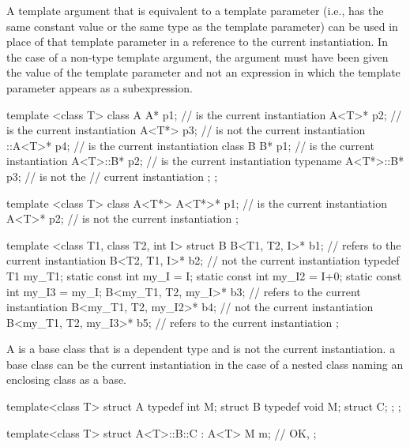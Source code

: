 \pnum
A template argument that is equivalent to a template
parameter (i.e., has the same constant value or the same type
as the template parameter) can be used in place of that
template parameter in a reference to the current
instantiation. In the case of a non-type template argument,
the argument must have been given the value of the
template parameter and not an expression in which the
template parameter appears as a subexpression.
\enterexample
\begin{codeblock}
template <class T> class A {
  A* p1;                        //  is the current instantiation
  A<T>* p2;                     //  is the current instantiation
  A<T*> p3;                     //  is not the current instantiation
  ::A<T>* p4;                   //  is the current instantiation
  class B {
    B* p1;                      //  is the current instantiation
    A<T>::B* p2;                //  is the current instantiation
    typename A<T*>::B* p3;      //  is not the
                                // current instantiation
  };
};

template <class T> class A<T*> {
  A<T*>* p1;                    //  is the current instantiation
  A<T>* p2;                     //  is not the current instantiation
};

template <class T1, class T2, int I> struct B {
  B<T1, T2, I>* b1;             // refers to the current instantiation
  B<T2, T1, I>* b2;             // not the current instantiation
  typedef T1 my_T1;
  static const int my_I = I;
  static const int my_I2 = I+0;
  static const int my_I3 = my_I;
  B<my_T1, T2, my_I>* b3;       // refers to the current instantiation
  B<my_T1, T2, my_I2>* b4;      // not the current instantiation
  B<my_T1, T2, my_I3>* b5;      // refers to the current instantiation
};
\end{codeblock}
\exitexample

\pnum
{}
A  is a base class that is a dependent type and is
not the current instantiation.
\enternote
a base class can be the current instantiation in the case of a nested class
naming an enclosing class as a base.
\enterexample
\begin{codeblock}
template<class T> struct A {
  typedef int M;
  struct B {
    typedef void M;
    struct C;
  };
};

template<class T> struct A<T>::B::C : A<T> {
  M m; // OK, 
};
\end{codeblock}
\exitexample
\exitnote


